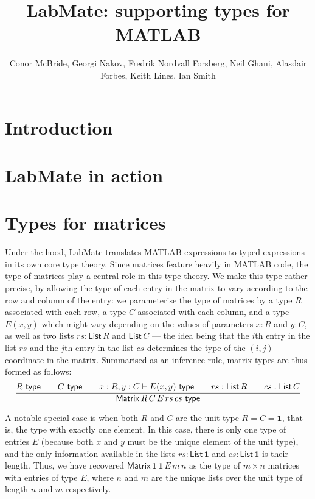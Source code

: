 \documentclass{ws-procs9x6}
\newcommand{\istype}[1]{#1\ \textsf{type}}
\newcommand{\One}{\mathbf{1}}
\newcommand{\Matrix}[5]{\mathsf{Matrix}\,#1\,#2\,#3\,#4\,#5}
\newcommand{\List}[1]{\mathsf{List}\,#1}
\begin{document}
\title{LabMate: supporting types for MATLAB}
\author{Conor McBride, Georgi Nakov, Fredrik Nordvall Forsberg, Neil Ghani, Alasdair Forbes, Keith Lines, Ian Smith}
\address{University of Strathclyde, National Physical Laboratory}

\bodymatter

\section{Introduction}





\section{LabMate in action}


\section{Types for matrices}

Under the hood, LabMate translates MATLAB expressions to typed
expressions in its own core type theory.
%
Since matrices feature heavily in MATLAB code, the type of matrices
play a central role in this type theory.
%
We make this type rather precise, by allowing the type of each entry
in the matrix to vary according to the row and column of the entry:
%
we parameterise the type of matrices by a type $R$ associated with
each row, a type $C$ associated with each column, and a type $E(x,y)$
which might vary depending on the values of parameters $x : R$ and
$y : C$, as well as two lists $rs : \List{R}$ and $\List{C}$ --- the
idea being that the $i$th entry in the list $rs$ and the $j$th entry
in the list $cs$ determines the type of the $(i, j)$ coordinate in the
matrix.
%
Summarised as an inference rule, matrix types are thus formed as follows:
%
\[
  \infer{\istype{\Matrix{R}{C}{E}{rs}{cs}}}
  {
    \istype{R}
    &\quad
    \istype{C}
    &\quad
    x : R, y : C \vdash \istype{E(x,y)}
    &\quad
    rs : \List{R}
    &\quad
    cs : \List{C}
  }
\]

A notable special case is when both $R$ and $C$ are the unit type
$R = C = \One$, that is, the type with exactly one element.
%
In this case, there is only one type of entries $E$ (because both $x$
and $y$ must be the unique element of the unit type), and the only
information available in the lists $rs : \List{\One}$ and
$cs : \List{\One}$ is their length.
%
Thus, we have recovered $\Matrix{\One}{\One}{E}{m}{n}$ as the type of
$m \times n$ matrices with entries of type $E$, where $n$ and $m$ are
the unique lists over the unit type of length $n$ and $m$
respectively.
\end{document}
